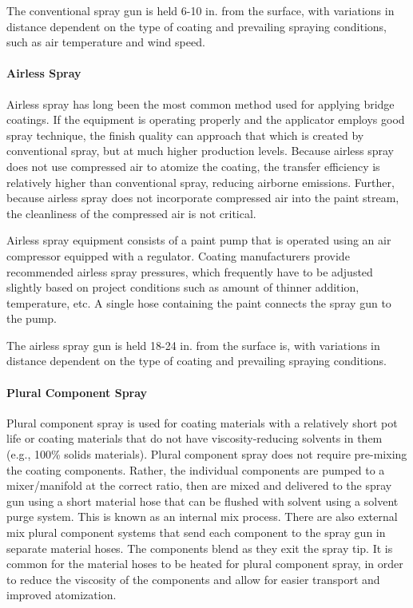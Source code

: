 The conventional spray gun is held 6-10 in. from the surface, with variations in distance dependent on the type of
coating and prevailing spraying conditions, such as air temperature and wind speed.

\paragraph{Airless Spray}
Airless spray has long been the most common method used for applying bridge coatings. If the equipment is
operating properly and the applicator employs good spray technique, the finish quality can approach that which is
created by conventional spray, but at much higher production levels. Because airless spray does not use compressed
air to atomize the coating, the transfer efficiency is relatively higher than conventional spray, reducing airborne
emissions. Further, because airless spray does not incorporate compressed air into the paint stream, the cleanliness of
the compressed air is not critical.

Airless spray equipment consists of a paint pump that is operated using an air compressor equipped with a
regulator. Coating manufacturers provide recommended airless spray pressures, which frequently have to be adjusted
slightly based on project conditions such as amount of thinner addition, temperature, etc. A single hose containing
the paint connects the spray gun to the pump.

The airless spray gun is held 18-24 in. from the surface is, with variations in distance dependent on the type of
coating and prevailing spraying conditions.

\paragraph{Plural Component Spray}
Plural component spray is used for coating materials with a relatively short pot life or coating materials that do
not have viscosity-reducing solvents in them (e.g., 100\% solids materials). Plural component spray does not require
pre-mixing the coating components. Rather, the individual components are pumped to a mixer/manifold at the correct
ratio, then are mixed and delivered to the spray gun using a short material hose that can be flushed with solvent using
a solvent purge system. This is known as an internal mix process. There are also external mix plural component
systems that send each component to the spray gun in separate material hoses. The components blend as they exit the
spray tip. It is common for the material hoses to be heated for plural component spray, in order to reduce the
viscosity of the components and allow for easier transport and improved atomization.

